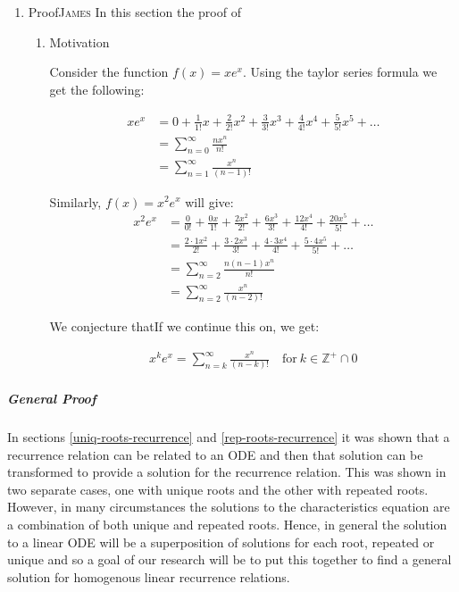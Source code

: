 \documentclass[a4paper,11pt,twoside]{article}
\begin{document}
\begin{enumerate}
\item Proof\hfill{}\textsc{James}
\label{prove-general-exp-identity}
In this section the proof of
\begin{enumerate}
\item Motivation
\label{sec:org267af5a}

Consider the function \(f(x) = xe^x\). Using the taylor series formula we get the following:

\begin{align*}
    xe^x &= 0+\frac{1}{1!}x+\frac{2}{2!}x^2+\frac{3}{3!}x^3+\frac{4}{4!}x^4+\frac{5}{5!}x^5+\dots\\
    &= \sum_{n=0}^\infty \frac{nx^n}{n!}\\
    &= \sum_{n=1}^\infty \frac{x^n}{(n-1)!}
\end{align*}

Similarly, \(f(x) = x^2e^x\) will give:
\begin{align*}
    x^2e^x &= \frac{0}{0!} + \frac{0x}{1!} + \frac{2x^2}{2!} + \frac{6x^3}{3!} + \frac{12x^4}{4!} + \frac{20x^5}{5!} + \dots\\
    &= \frac{2\cdot 1x^2}{2!} + \frac{3\cdot 2 x^3}{3!} + \frac{4\cdot 3x^4}{4!} + \frac{5\cdot 4 x^5}{5!} + \dots\\
    &= \sum_{n=2}^\infty \frac{n(n-1)x^n}{n!}\\
    &= \sum_{n=2}^\infty \frac{x^n}{(n-2)!}
\end{align*}

We conjecture thatIf we continue this on, we get:

\begin{align*}
    x^ke^x = \sum_{n=k}^\infty \frac{x^n}{(n-k)!} \quad \text{for}~k\in \mathbb{Z^{+}}\cap0
\end{align*}
\end{enumerate}
\end{enumerate}

\subparagraph{General Proof}
\label{general-gen-func-proof}
In sections \ref{uniq-roots-recurrence} and \ref{rep-roots-recurrence}
it was shown that a recurrence relation can be related to an ODE and then that
solution can be transformed to provide a solution for the recurrence relation.
This was shown in two separate cases, one with unique roots and the other with
repeated roots. However, in many circumstances the solutions to the characteristics
equation are a combination of both unique and repeated roots. Hence, in general the
solution to a linear ODE will be a superposition of solutions for each root, repeated
or unique and so a goal of our research will be to put this together to find a general
solution for homogenous linear recurrence relations.
\end{document}
